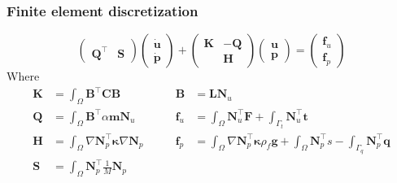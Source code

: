 \documentclass{beamer}
\begin{document}
\begin{frame}
  \frametitle{Finite element discretization}

  \[
    \begin{pmatrix} & \\ \bm{Q}^\intercal & \bm{S} \end{pmatrix}
    \begin{pmatrix} \dot{\bm{u}} \\ \dot{\bm{p}} \end{pmatrix} +
    \begin{pmatrix} \bm{K} & -\bm{Q} \\ & \bm{H} \end{pmatrix}
    \begin{pmatrix} \bm{u} \\ \bm{p} \end{pmatrix} =
    \begin{pmatrix} \bm{f}_u \\ \bm{f}_p \end{pmatrix}
  \]
  Where
  \begin{align*}
    \bm{K} &= \int_\Omega \bm{B}^\intercal \bm{CB} \qquad
             & \bm{B} &= \bm{L} \bm{N}_u \\
    \bm{Q} &= \int_\Omega \bm{B}^\intercal \alpha \bm{m} \bm{N}_u \qquad
             & \bm{f}_u &= \int_\Omega \bm{N}_u^\intercal \bm{F}
                          + \int_{\Gamma_t} \bm{N}_u^\intercal \bm{t} \\
    \bm{H} &= \int_\Omega \nabla \bm{N}_p^\intercal \bm{\kappa} \nabla \bm{N}_p \qquad
             & \bm{f}_p &= \int_\Omega \nabla \bm{N}_p^\intercal \bm{\kappa} \rho_f \bm{g}
                          + \int_\Omega \bm{N}_p^\intercal s
                          - \int_{\Gamma_q} \bm{N}_p^\intercal \bm{q} \\
    \bm{S} &= \int_\Omega \bm{N}_p^\intercal \frac{1}{M} \bm{N}_p
  \end{align*}
\end{frame}
\end{document}
